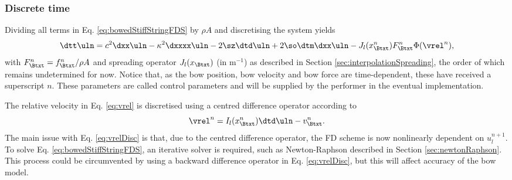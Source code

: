 \subsubsection{Discrete time}
Dividing all terms in Eq. \eqref{eq:bowedStiffStringFDS} by $\rho A$ and discretising the system yields
%
\begin{equation}\label{eq:bowedStiffStringFDS}
    \dtt \uln = c^2 \dxx \uln - \kappa^2 \dxxxx \uln - 2 \sz \dtd \uln + 2 \so\dtm\dxx \uln - J_l(x_\Btxt^n)F_\Btxt^n\Phi(\vrel^n),
\end{equation}
with $F_\Btxt^n = f_\Btxt^n/\rho A$ and spreading operator $J_l(x_\Btxt)$ (in m$^{-1}$) as described in Section \ref{sec:interpolationSpreading}, the order of which remains undetermined for now. Notice that, as the bow position, bow velocity and bow force are time-dependent, these have received a superscript $n$. These parameters are called control parameters and will be supplied by the performer in the eventual implementation.

The relative velocity in Eq. \eqref{eq:vrel} is discretised using a centred difference operator according to
\begin{equation}\label{eq:vrelDisc}
    \vrel^n = I_l(x_\Btxt^n)\dtd \uln - v_\Btxt^n.
\end{equation}
The main issue with Eq. \eqref{eq:vrelDisc} is that, due to the centred difference operator, the FD scheme is now nonlinearly dependent on $u_l^{n+1}$. To solve Eq. \eqref{eq:bowedStiffStringFDS}, an iterative solver is required, such as Newton-Raphson described in Section \ref{sec:newtonRaphson}. This process could be circumvented by using a backward  difference operator in Eq. \eqref{eq:vrelDisc}, but this will affect accuracy of the bow model.

